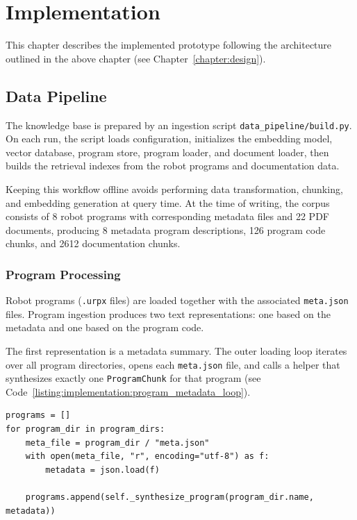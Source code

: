 \chapter{Implementation} \label{sec:implementation}
This chapter describes the implemented prototype following the architecture outlined in the above chapter (see Chapter~\ref{chapter:design}).

\section{Data Pipeline}
The knowledge base is prepared by an ingestion script \texttt{data\_pipeline/build.py}. On each run, the script loads configuration, initializes the embedding model, vector database, program store, program loader, and document loader, then builds the retrieval indexes from the robot programs and documentation data.

Keeping this workflow offline avoids performing data transformation, chunking, and embedding generation at query time. At the time of writing, the corpus consists of 8 robot programs with corresponding metadata files and 22 PDF documents, producing 8 metadata program descriptions, 126 program code chunks, and 2612 documentation chunks.

\subsection{Program Processing}
Robot programs (\texttt{.urpx} files) are loaded together with the associated \texttt{meta.json} files. Program ingestion produces two text representations: one based on the metadata and one based on the program code.

The first representation is a metadata summary. The outer loading loop iterates over all program directories, opens each \texttt{meta.json} file, and calls a helper that synthesizes exactly one \texttt{ProgramChunk} for that program (see Code~\ref{listing:implementation:program_metadata_loop}).

\begin{listing}[H]
	\begin{verbatim}
programs = []
for program_dir in program_dirs:
    meta_file = program_dir / "meta.json"
    with open(meta_file, "r", encoding="utf-8") as f:
        metadata = json.load(f)

    programs.append(self._synthesize_program(program_dir.name, metadata))
	\end{verbatim}
	\caption{Load each program's metadata file and create one metadata chunk per program.}
	\label{listing:implementation:program_metadata_loop}
\end{listing}

